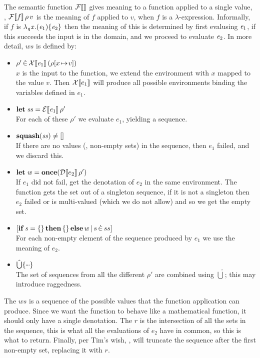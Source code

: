 The semantic function $\mathcal{F}\llbracket  \rrbracket$ gives meaning to a function applied to a single value, \ie,
$\mathcal{F}\llbracket f \rrbracket\, \rho \, v$ is the meaning of $f$ applied to $v$, when $f$ is a $\lambda$-expression.
Informally, if $f$ is \ensuremath{\lambda_{\Varid{q}}\Varid{x}.(\Varid{e}_{\mathrm{1}})\{\Varid{e}_{\mathrm{2}}\}} then the meaning of this is determined by first evalusing \ensuremath{\Varid{e}_{\mathrm{1}}},
if this succeeds the input is in the domain, and we proceed to evaluate \ensuremath{\Varid{e}_{\mathrm{2}}}.
In more detail, $ws$ is defined by:
\begin{itemize}
\item $\rho' \,\dot{\in}\, \mathcal{X}\llbracket \mathit{e}_{\mathrm{1}} \rrbracket\, (\rho[x \!\mapsto\! v])$ \\
  $x$ is the input to the function, we extend the environment with $x$ mapped to the value $v$.
  Then $\mathcal{X}\llbracket e_1 \rrbracket$ will produce all possible environments binding the variables defined in $e_1$.
\item $\mathbf{let}\;\mathit{ss} = \mathcal{E}\llbracket \mathit{e}_{\mathrm{1}} \rrbracket\, \rho'$ \\
  For each of these $\rho'$ we evaluate $e_1$, yielding a sequence.
\item $\textbf{squash}(\mathit{ss}) \neq []$ \\
  If there are no values (\ie, non-empty sets) in the sequence, then $e_1$ failed, and we discard this.
\item $\mathbf{let}\;\mathit{w} = \textbf{once}(\mathcal{D}\llbracket e_2 \rrbracket\, \rho')$ \\
  If $e_1$ did not fail, get the denotation of $e_2$ in the same environment.
  The {\once} function gets the set out of a singleton sequence, if it is not a singleton then
  $e_2$ failed or is multi-valued (which we do not allow) and so we get the empty set.
\item $[ \textbf{if}\;\mathit{s}\mathrel{=}\{\}\,\textbf{then}\,\{\}\,\textbf{else}\, w\,|\, s \,\dot{\in}\, ss ]$ \\
  For each non-empty element of the sequence produced by $e_1$ we use the meaning of $e_2$.
\item $\hat{\bigcup}\{\mydots\}$ \\
  The set of sequences from all the different $\rho'$ are combined using $\hat{\bigcup}$;
  this may introduce raggedness.
\end{itemize}
The $ws$ is a sequence of the possible values that the function application can produce.
Since we want the function to behave like a mathematical function, it should only have a single denotation.
The $r$ is the intersection of all the sets in the sequence, this is what all the evaluations of $e_2$ have
in common, so this is what to return.  Finally, per Tim's wish, {\trunc}, will truncate the sequence after
the first non-empty set, replacing it with $r$.

